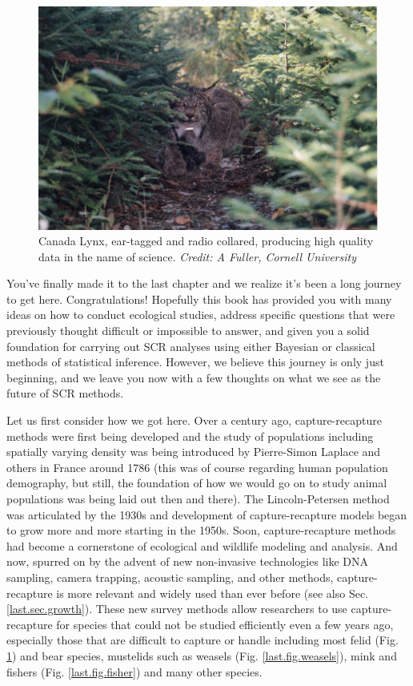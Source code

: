 \begin{figure}[h!]
\centering
\includegraphics[width=\textwidth]{Ch20-Last/lynx.jpg}
\caption{
Canada Lynx, ear-tagged and radio collared, producing high quality
data in the name of science.
{\it Credit: A Fuller, Cornell University} }
\label{last.fig.lynx}
\end{figure}

You've finally made it to the last chapter and we realize it's been a long journey to
get here. Congratulations! %
Hopefully this book has provided you with many ideas on how
to conduct ecological studies, address specific questions that were previously
thought difficult or impossible
to answer, and given you a solid foundation for carrying out SCR analyses
using either Bayesian or classical methods of statistical
inference.
However, we believe this journey is only just beginning, and we leave you
now with a few thoughts on what we see as the future of SCR methods.

Let us first consider how we got here. Over a century ago, capture-recapture
methods were first being developed and the study of populations including
spatially varying density was being introduced by Pierre-Simon Laplace and others in France around
1786 (this was of course regarding human population demography, but still, the foundation of how
we would go on to study animal populations was being laid out then and there).
The Lincoln-Petersen method was articulated by
 the 1930s and development of
capture-recapture models began to grow more and more starting in the 1950s.
Soon, capture-recapture methods had become a cornerstone of ecological and wildlife
modeling and analysis. And now, spurred on by the advent of
new non-invasive technologies like DNA
sampling, camera trapping, acoustic sampling, and other methods,
capture-recapture is more relevant and widely used than ever before
(see also Sec. \ref{last.sec.growth}). These new survey methods allow
researchers to use capture-recapture for species that could not be
studied efficiently even a few years ago, especially those that are
difficult to capture or handle including most felid
(Fig. \ref{last.fig.lynx})
and bear
species, mustelids such as weasels (Fig. \ref{last.fig.weasels}),
mink and fishers (Fig. \ref{last.fig.fisher}) and many other species.

